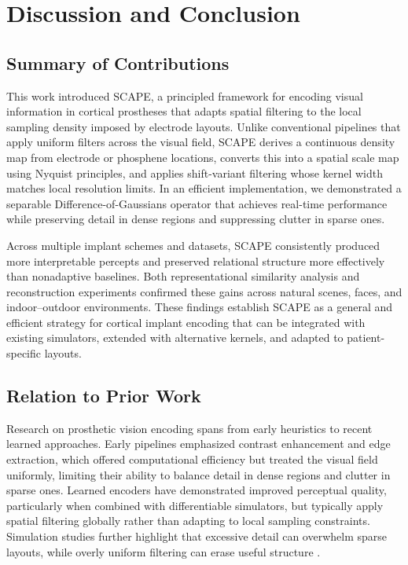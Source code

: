 \section{Discussion and Conclusion}

\subsection{Summary of Contributions}
This work introduced SCAPE, a principled framework for encoding visual information in cortical prostheses that adapts spatial filtering to the local sampling density imposed by electrode layouts. Unlike conventional pipelines that apply uniform filters across the visual field, SCAPE derives a continuous density map from electrode or phosphene locations, converts this into a spatial scale map using Nyquist principles, and applies shift-variant filtering whose kernel width matches local resolution limits. In an efficient implementation, we demonstrated a separable Difference-of-Gaussians operator that achieves real-time performance while preserving detail in dense regions and suppressing clutter in sparse ones.

Across multiple implant schemes and datasets, SCAPE consistently produced more interpretable percepts and preserved relational structure more effectively than nonadaptive baselines. Both representational similarity analysis and reconstruction experiments confirmed these gains across natural scenes, faces, and indoor–outdoor environments. These findings establish SCAPE as a general and efficient strategy for cortical implant encoding that can be integrated with existing simulators, extended with alternative kernels, and adapted to patient-specific layouts.

\subsection{Relation to Prior Work}
Research on prosthetic vision encoding spans from early heuristics to recent learned approaches. Early pipelines emphasized contrast enhancement and edge extraction, which offered computational efficiency but treated the visual field uniformly, limiting their ability to balance detail in dense regions and clutter in sparse ones. Learned encoders have demonstrated improved perceptual quality, particularly when combined with differentiable simulators, but typically apply spatial filtering globally rather than adapting to local sampling constraints. Simulation studies further highlight that excessive detail can overwhelm sparse layouts, while overly uniform filtering can erase useful structure \cite{Han2021,Kasowski2022}.

